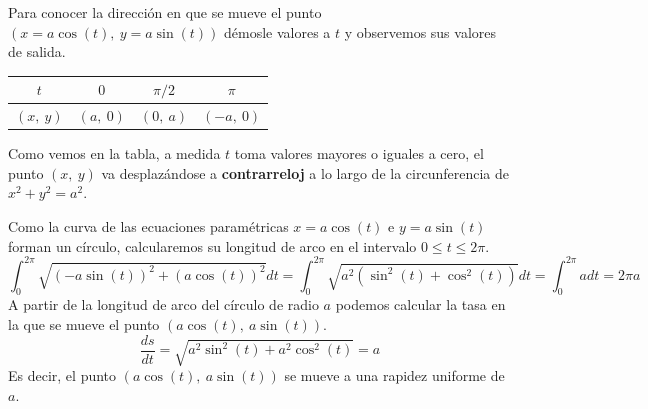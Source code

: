\documentclass[12pt]{article}
\begin{document}
Para conocer la dirección en que se mueve el punto $(x = a \cos(t), \ y = a \sin(t))$ démosle valores a $t$ y observemos sus valores de salida.

\begin{table}[hbt!]
\centering

\begin{tabular}{c|c c c}
$t$ & $0$ & $\pi / 2$ & $\pi$ \\
\hline
$(x, \ y)$ & $(a, \ 0)$ & $(0, \ a)$ & $(-a, \ 0)$
\end{tabular}

\end{table}

Como vemos en la tabla, a medida $t$ toma valores mayores o iguales a cero, el punto $(x, \ y)$ va desplazándose a \textbf{contrarreloj} a lo largo de la circunferencia de $x^{2} + y^{2} = a^{2}$.

\begin{figure}[hbt!]
\centering


\end{figure}

Como la curva de las ecuaciones paramétricas $x = a \cos(t)$ e $y = a \sin(t)$ forman un círculo, calcularemos su longitud de arco en el intervalo $0 \leq t \leq 2\pi$.
\[
  \int_{0}^{2\pi} \sqrt{\left(-a \sin(t)\right)^{2} + \left(a \cos(t)\right)^{2}} dt =
    \int_{0}^{2\pi} \sqrt{a^{2} \left(\sin^{2}(t) + \cos^{2}(t)\right)} dt =
    \int_{0}^{2\pi} a dt =
    2\pi a
\]
A partir de la longitud de arco del círculo de radio $a$ podemos calcular la tasa en la que se mueve el punto $(a \cos(t), \ a \sin(t))$.
\[
  \frac{ds}{dt} = \sqrt{a^{2} \sin^{2}(t) + a^{2} \cos^{2}(t)} = a
\]
Es decir, el punto $(a \cos(t), \ a \sin(t))$ se mueve a una rapidez uniforme de $a$.
\end{document}
